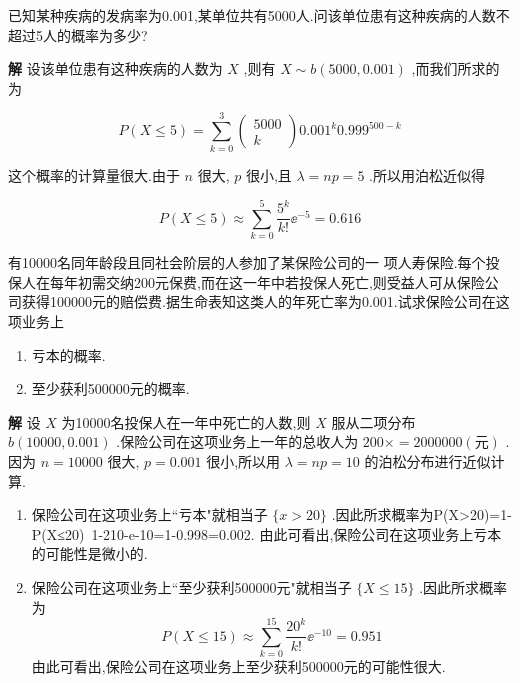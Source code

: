 \begin{example}\label{exam:2.4.6}
	已知某种疾病的发病率为0.001,某单位共有5000人.问该单位患有这种疾病的人数不超过5人的概率为多少?
	
	\textbf{解} 设该单位患有这种疾病的人数为 $ X $ ,则有 $ X\sim b(5000,0.001) $ ,而我们所求的为
	
	\[
	P(X \leqslant 5)=\sum_{k=0}^{3} \left( 
	\begin{array}{c}{5000} \\ 
	{k}
	\end{array}\right) 0.001^{k} 0.999^{500-k}
	\]
	
	这个概率的计算量很大.由于 $ n $ 很大, $ p $ 很小,且 $ \lambda=n p=5 $ .所以用泊松近似得
	
	\[
	P(X \leqslant 5) \approx \sum_{k=0}^{5} \frac{5^{k}}{k !} \ee ^{-5}=0.616
	\]
	
\end{example}

\begin{example}\label{exam:2.4.7}
	有10000名同年龄段且同社会阶层的人参加了某保险公司的一
	项人寿保险.每个投保人在每年初需交纳200元保费,而在这一年中若投保人死亡,则受益人可从保险公司获得100000元的赔偿费.据生命表知这类人的年死亡率为0.001.试求保险公司在这项业务上
	
	\begin{enumerate}
		\item 亏本的概率.
		\item 至少获利500000元的概率.
	\end{enumerate}
	
	\textbf{解} 设 $ X $ 为10000名投保人在一年中死亡的人数,则 $ X $ 服从二项分布 $ b(10000,0.001) $ .保险公司在这项业务上一年的总收人为 $ 200\times = 2000000(\text{元}) $ .因为 $ n=10000 $ 很大, $ p=0.001 $ 很小,所以用 $ \lambda =np=10 $ 的泊松分布进行近似计算.
	
	\begin{enumerate}
		\item 保险公司在这项业务上``亏本"就相当子 $ \{x>20\} $ .因此所求概率为P(X>20)=1-P(X≤20)~1-210-e-10=1-0.998=0.002.
		由此可看出,保险公司在这项业务上亏本的可能性是微小的.
		\item 保险公司在这项业务上``至少获利500000元"就相当子 $ \{X \leqslant 15\} $ .因此所求概率为
		\[
		P(X \leqslant 15) \approx \sum_{k=0}^{15} \frac{20^{k}}{k !} \ee ^{-10}=0.951
		\]
		由此可看出,保险公司在这项业务上至少获利500000元的可能性很大.
	\end{enumerate}
\end{example}


